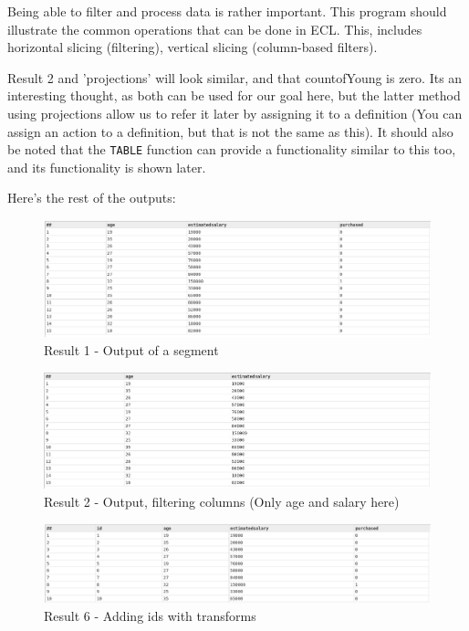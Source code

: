 Being able to filter and process data is rather important. This program should illustrate the common operations that can be done in ECL. This, includes horizontal slicing (filtering), vertical slicing (column-based filters).





Result 2 and 'projections' will look similar, and that countofYoung is zero. Its an interesting thought, as both can be used for our goal here, but the latter method using projections allow us to refer it later by assigning it to a definition (You can assign an action to a definition, but that is not the same as this). It should also be noted that the \lstinline{TABLE} function can provide a functionality similar to this too, and its functionality is shown later.

Here's the rest of the outputs:

\begin{figure}[h]
    \centering
    \includegraphics[width=\linewidth]{../output/26/1.png}
    \caption{Result 1 - Output of a segment}
\end{figure}


\begin{figure}[h]
    \centering
    \includegraphics[width=\linewidth]{../output/26/2.png}
    \caption{Result 2 - Output, filtering columns (Only age and salary here)}
\end{figure}

\begin{figure}[h]
    \centering
    \includegraphics[width=\linewidth]{../output/26/6withid.png}
    \caption{Result 6 - Adding ids with transforms}
\end{figure}


